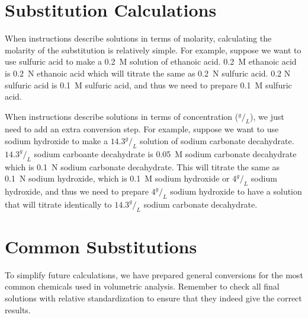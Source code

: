 \section{Substitution Calculations}

When instructions describe solutions in terms of molarity, calculating the molarity of the substitution is relatively simple. For example, suppose we want to use sulfuric acid to make a 0.2~M solution of ethanoic acid. 0.2~M ethanoic acid is 0.2~N ethanoic acid which will titrate the same as 0.2~N sulfuric acid. 0.2 N sulfuric acid is 0.1~M sulfuric acid, and thus we need to prepare 0.1~M sulfuric acid.

When instructions describe solutions in terms of concentration ($^g/_L$), we just need to add an extra conversion step. For example, suppose we want to use sodium hydroxide to make a $14.3 ^g/_L$ solution of sodium carbonate decahydrate. $14.3 ^g/_L$ sodium carboante decahydrate is 0.05~M sodium carbonate decahydrate which is 0.1~N sodium carbonate decahydrate. This will titrate the same as 0.1~N sodium hydroxide, which is 0.1~M sodium hydroxide or $4 ^g/_L$ sodium hydroxide, and thus we need to prepare $4 ^g/_L$ sodium hydroxide to have a solution that will titrate identically to $14.3 ^g/_L$ sodium carbonate decahydrate.

\section{Common Substitutions}
\label{sec:commonsubs}
To simplify future calculations, we have prepared general conversions for the most common chemicals used in volumetric analysis. Remember to check all final solutions with relative standardization to ensure that they indeed give the correct results.

